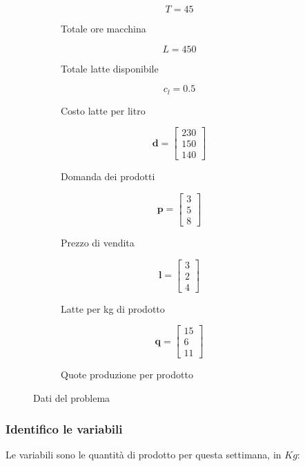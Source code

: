 \documentclass[\main/main.tex]{subfiles}
\begin{document}
\begin{figure}
  \begin{subfigure}{0.31\textwidth}
    \[
      T = 45
    \]
    \caption{Totale ore macchina}
  \end{subfigure}
  \begin{subfigure}{0.31\textwidth}
    \[
      L = 450
    \]
    \caption{Totale latte disponibile}
  \end{subfigure}
  \begin{subfigure}{0.31\textwidth}
    \[
      c_l = 0.5
    \]
    \caption{Costo latte per litro}
  \end{subfigure}
  \begin{subfigure}{0.24\textwidth}
    \[
      \bm{d} = \begin{bmatrix}
        230 \\
        150 \\
        140
      \end{bmatrix}
    \]
    \caption{Domanda dei prodotti}
  \end{subfigure}
  \begin{subfigure}{0.24\textwidth}
    \[
      \bm{p} = \begin{bmatrix}
        3 \\
        5 \\
        8
      \end{bmatrix}
    \]
    \caption{Prezzo di vendita}
  \end{subfigure}
  \begin{subfigure}{0.24\textwidth}
    \[
      \bm{l} = \begin{bmatrix}
        3 \\
        2 \\
        4
      \end{bmatrix}
    \]
    \caption{Latte per kg di prodotto}
  \end{subfigure}
  \begin{subfigure}{0.24\textwidth}
    \[
      \bm{q} = \begin{bmatrix}
        15 \\
        6  \\
        11
      \end{bmatrix}
    \]
    \caption{Quote produzione per prodotto}
  \end{subfigure}
  \caption{Dati del problema}
\end{figure}
\subsubsection*{Identifico le variabili}
Le variabili sono le quantità di prodotto per questa settimana, in $Kg$:
\end{document}
